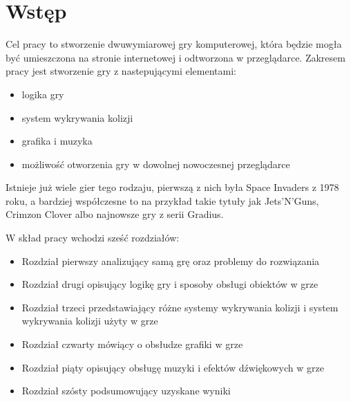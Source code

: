 \chapter{Wstęp}
\thispagestyle{chapterBeginStyle}
\label{ch:intro}

Cel pracy to stworzenie dwuwymiarowej gry komputerowej, która będzie mogła być umieszczona na stronie internetowej i odtworzona w przeglądarce.
Zakresem pracy jest stworzenie gry z nastepującymi elementami:
\begin{itemize}
	\item logika gry
	\item system wykrywania kolizji
	\item grafika i muzyka
	\item możliwo\'sć otworzenia gry w dowolnej nowoczesnej przeglądarce
\end{itemize}

Istnieje już wiele gier tego rodzaju, pierwszą z nich była Space Invaders z 1978 roku, a bardziej współczesne to na przykład takie tytuły jak Jets'N'Guns, Crimzon Clover albo najnowsze gry z serii Gradius.

W skład pracy wchodzi sze\'sć rozdziałów:
\begin{itemize}
	\item Rozdział pierwszy analizujący samą grę oraz problemy do rozwiązania
	\item Rozdział drugi opisujący logikę gry i sposoby obsługi obiektów w grze
	\item Rozdział trzeci przedstawiający różne systemy wykrywania kolizji i system wykrywania kolizji użyty w grze
	\item Rozdział czwarty mówiący o obsłudze grafiki w grze
	\item Rozdział piąty opisujący obsługę muzyki i efektów dźwiękowych w grze
	\item Rozdział szósty podsumowujący uzyskane wyniki
\end{itemize}

\cleardoublepage